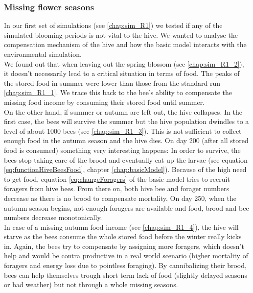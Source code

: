 	\subsubsection{Missing flower seasons}
		\label{chap:missingFlowerSeasons}
		In our first set of simulations (see \ref{chap:sim_R1}) we tested if any of the simulated blooming periods is not vital to the hive. We wanted to analyse the compensation mechanism of the hive and how the basic model interacts with the environmental simulation.\\
		
		We found out that when leaving out the spring blossom (see \ref{chap:sim_R1_2}), it doesn't necessarily lead to a critical situation in terms of food. The peaks of the stored food in summer were lower than those from the standard run \ref{chap:sim_R1_1}. We trace this back to the bee's ability to compensate the missing food income by consuming their stored food until summer.\\
		
		On the other hand, if summer or autumn are left out, the hive collapses. In the first case, the bees will survive the summer but the hive population dwindles to a level of about 1000 bees (see \ref{chap:sim_R1_3}). This is not sufficient to collect enough food in the autumn season and the hive dies. On day 200 (after all stored food is consumed) something very interesting happens: In order to survive, the bees stop taking care of the brood and eventually eat up the larvae (see equation \ref{eq:functionHiveBeesFood}, chapter \ref{chap:basicModel}). Because of the high need to get food, equation \ref{eq:changeForagers} of the basic model tries to recruit foragers from hive bees. From there on, both hive bee and forager numbers decrease as there is no brood to compensate mortality. On day 250, when the autumn season begins, not enough foragers are available and food, brood and bee numbers decrease monotonically.\\
		
		In case of a missing autumn food income (see \ref{chap:sim_R1_4}), the hive will starve as the bees consume the whole stored food before the winter really kicks in. Again, the bees try to compensate by assigning more foragers, which doesn't help and would be contra productive in a real world scenario (higher mortality of foragers and energy loss due to pointless foraging).
		By cannibalizing their brood, bees can help themselves trough short term lack of food (slightly delayed seasons or bad weather) but not through a whole missing seasons.
		
